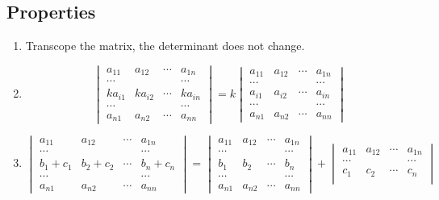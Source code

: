 \documentclass{article}
\begin{document}
\subsection{Properties}
\begin{enumerate}
    \item Transcope the matrix, the determinant does not change.
    \item 
    $$\begin{vmatrix}
        a_{11} & a_{12} & \cdots & a_{1n}\\
        \cdots &  &  & \cdots\\
        ka_{i1} & ka_{i2} & \cdots & ka_{in}\\
        \cdots &  &  & \cdots\\
        a_{n1} & a_{n2} & \cdots & a_{nn}
        \end{vmatrix}
    = k\begin{vmatrix}
        a_{11} & a_{12} & \cdots & a_{1n}\\
        \cdots &  &  & \cdots\\
        a_{i1} & a_{i2} & \cdots & a_{in}\\
        \cdots &  &  & \cdots\\
        a_{n1} & a_{n2} & \cdots & a_{nn}
        \end{vmatrix}$$
    \item 
    $$\begin{vmatrix}
        a_{11} & a_{12} & \cdots & a_{1n}\\
        \cdots &  &  & \cdots\\
        b_{1}+c_{1} & b_{2}+c_{2} & \cdots & b_{n}+c_{n}\\
        \cdots &  &  & \cdots\\
        a_{n1} & a_{n2} & \cdots & a_{nn}
    \end{vmatrix}
    =
    \begin{vmatrix}
        a_{11} & a_{12} & \cdots & a_{1n}\\
        \cdots &  &  & \cdots\\
        b_{1} & b_{2} & \cdots & b_{n}\\
        \cdots &  &  & \cdots\\
        a_{n1} & a_{n2} & \cdots & a_{nn}
    \end{vmatrix}
    +
    \begin{vmatrix}
        a_{11} & a_{12} & \cdots & a_{1n}\\
        \cdots &  &  & \cdots\\
        c_{1} & c_{2} & \cdots & c_{n}\\

\end{vmatrix}$$
\end{enumerate}
\end{document}
